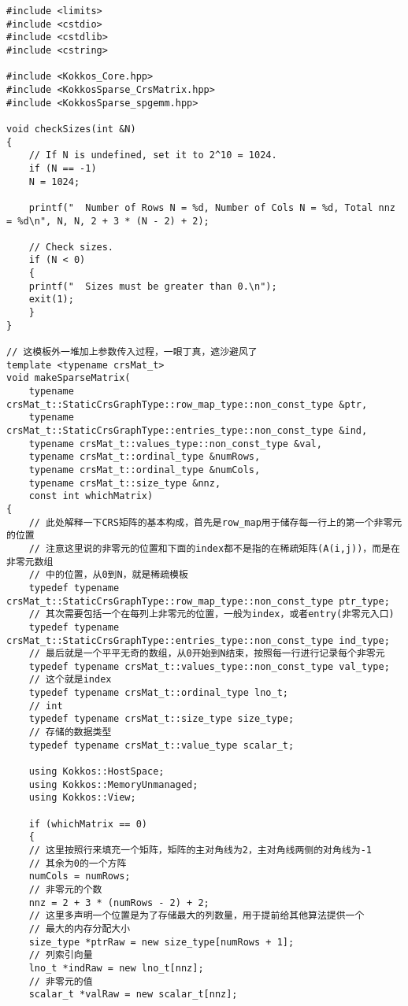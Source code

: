\begin{lstlisting}
#include <limits>
#include <cstdio>
#include <cstdlib>
#include <cstring>

#include <Kokkos_Core.hpp>
#include <KokkosSparse_CrsMatrix.hpp>
#include <KokkosSparse_spgemm.hpp>

void checkSizes(int &N)
{
    // If N is undefined, set it to 2^10 = 1024.
    if (N == -1)
    N = 1024;

    printf("  Number of Rows N = %d, Number of Cols N = %d, Total nnz = %d\n", N, N, 2 + 3 * (N - 2) + 2);

    // Check sizes.
    if (N < 0)
    {
    printf("  Sizes must be greater than 0.\n");
    exit(1);
    }
}

// 这模板外一堆加上参数传入过程，一眼丁真，遮沙避风了
template <typename crsMat_t>
void makeSparseMatrix(
    typename crsMat_t::StaticCrsGraphType::row_map_type::non_const_type &ptr,
    typename crsMat_t::StaticCrsGraphType::entries_type::non_const_type &ind,
    typename crsMat_t::values_type::non_const_type &val,
    typename crsMat_t::ordinal_type &numRows,
    typename crsMat_t::ordinal_type &numCols,
    typename crsMat_t::size_type &nnz,
    const int whichMatrix)
{
    // 此处解释一下CRS矩阵的基本构成，首先是row_map用于储存每一行上的第一个非零元的位置
    // 注意这里说的非零元的位置和下面的index都不是指的在稀疏矩阵(A(i,j))，而是在非零元数组
    // 中的位置，从0到N，就是稀疏模板
    typedef typename crsMat_t::StaticCrsGraphType::row_map_type::non_const_type ptr_type;
    // 其次需要包括一个在每列上非零元的位置，一般为index，或者entry(非零元入口)
    typedef typename crsMat_t::StaticCrsGraphType::entries_type::non_const_type ind_type;
    // 最后就是一个平平无奇的数组，从0开始到N结束，按照每一行进行记录每个非零元
    typedef typename crsMat_t::values_type::non_const_type val_type;
    // 这个就是index
    typedef typename crsMat_t::ordinal_type lno_t;
    // int
    typedef typename crsMat_t::size_type size_type;
    // 存储的数据类型
    typedef typename crsMat_t::value_type scalar_t;

    using Kokkos::HostSpace;
    using Kokkos::MemoryUnmanaged;
    using Kokkos::View;

    if (whichMatrix == 0)
    {
    // 这里按照行来填充一个矩阵，矩阵的主对角线为2，主对角线两侧的对角线为-1
    // 其余为0的一个方阵
    numCols = numRows;
    // 非零元的个数
    nnz = 2 + 3 * (numRows - 2) + 2;
    // 这里多声明一个位置是为了存储最大的列数量，用于提前给其他算法提供一个
    // 最大的内存分配大小
    size_type *ptrRaw = new size_type[numRows + 1];
    // 列索引向量
    lno_t *indRaw = new lno_t[nnz];
    // 非零元的值
    scalar_t *valRaw = new scalar_t[nnz];


\end{lstlisting}
